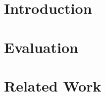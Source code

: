 \documentclass[letterpaper,12pt,titlepage,oneside,final]{book}
\begin{document}
 

\chapter{Introduction}







\chapter{Evaluation}


\chapter{Related Work}
\end{document}
